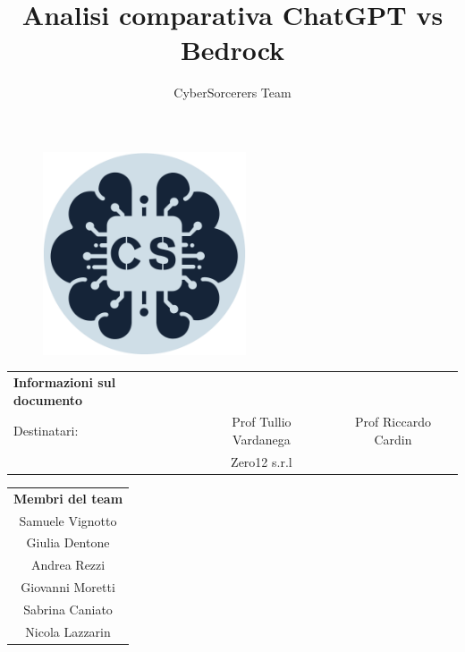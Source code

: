 \documentclass{article}
\title{\Huge{\textbf{Analisi comparativa ChatGPT vs Bedrock}}\vspace{-1em}}
\author{CyberSorcerers Team}
\date{}
\begin{document}
\maketitle

\vspace{-3em}
\begin{figure}[h]
  \centering
  \includegraphics[width=6cm, height=6cm]{documenti/logo rotondo.png}
  \label{fig:immagine}
\end{figure}

\vspace{6em}
\large{

\begin{center}
    \begin{tabular}{l c c}
        \rowcolor{Blue} 
        \textbf{Informazioni sul documento} & &\\ [1 ex]
        \rowcolor{LighterBlue}
        Destinatari: & Prof Tullio Vardanega & Prof Riccardo Cardin\\ [1 ex]
        \rowcolor{LightBlue}
         & Zero12 s.r.l & \\ [1 ex]
    \end{tabular}
\end{center}}

\begin{table}[h]
\centering
\begin{tabular}{c}
\rowcolor{Blue}
\textbf{Membri del team} \\
\rowcolor{LighterBlue}
Samuele Vignotto \\
\rowcolor{LightBlue}
Giulia Dentone \\
\rowcolor{LighterBlue}
Andrea Rezzi \\
\rowcolor{LightBlue}
Giovanni Moretti \\
\rowcolor{LighterBlue}
Sabrina Caniato \\
\rowcolor{LightBlue}
Nicola Lazzarin \\
\end{tabular}
\end{table}
\end{document}
